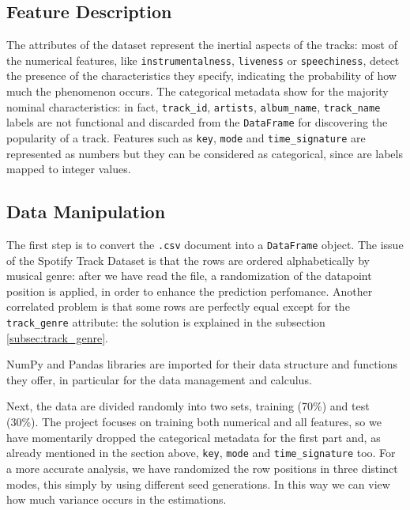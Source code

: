 \documentclass{article}
\begin{document}
\subsection{Feature Description}
\label{subsec:feature_descr}
The attributes of the dataset represent the inertial aspects of the tracks: most of the numerical features, like \texttt{instrumentalness}, \texttt{liveness} or \texttt{speechiness}, detect the presence of the characteristics they specify, indicating the probability of how much the phenomenon occurs. 
The categorical metadata show for the majority nominal characteristics: in fact, \texttt{track\_id}, \texttt{artists}, \texttt{album\_name}, \texttt{track\_name} labels are not functional and discarded from the \texttt{DataFrame} for discovering the popularity of a track. Features such as \texttt{key}, \texttt{mode} and \texttt{time\_signature} are represented as numbers but they can be considered as categorical, since are labels mapped to integer values.  

\subsection{Data Manipulation}
\label{subsec:dataman}    
The first step is to convert the \texttt{.csv} document into a \texttt{DataFrame} object. 
The issue of the Spotify Track Dataset is that the rows are ordered alphabetically by musical genre: after we have read the file, a randomization of the datapoint position is applied, in order to enhance the prediction perfomance. Another correlated problem is that some rows are perfectly equal except for the \texttt{track\_genre} attribute: the solution is explained in the subsection \ref{subsec:track_genre}. 
    
NumPy and Pandas libraries are imported for  their data structure and functions they offer, in particular for the data management and calculus.
    
Next, the data are divided randomly into two sets, training (70\%) and test (30\%).
The project focuses on training both numerical and all features, so we have momentarily dropped the categorical metadata for the first part and, as already mentioned in the section above, \texttt{key}, \texttt{mode} and \texttt{time\_signature} too. 
For a more accurate analysis, we have randomized the row positions in three distinct modes, this simply by using different seed generations. In this way we can view how much variance occurs in the estimations.
\end{document}
